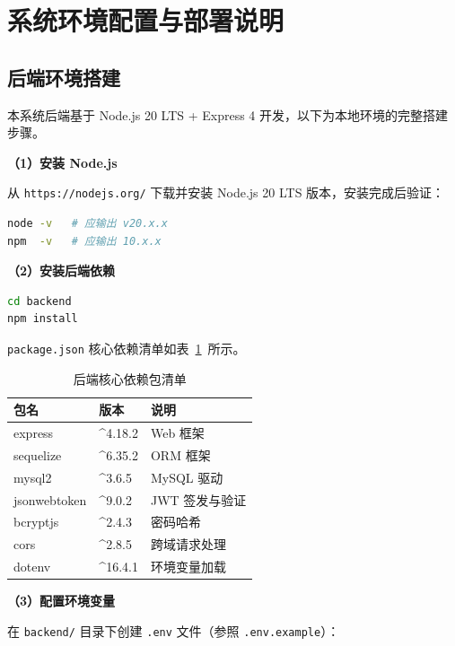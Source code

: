 \appendices
\section{系统环境配置与部署说明}

\subsection{后端环境搭建}

本系统后端基于 Node.js 20 LTS + Express 4 开发，以下为本地环境的完整搭建步骤。

\textbf{（1）安装 Node.js}

从 \texttt{https://nodejs.org/} 下载并安装 Node.js 20 LTS 版本，安装完成后验证：

\begin{lstlisting}[language=bash, caption={验证 Node.js 安装}]
node -v   # 应输出 v20.x.x
npm  -v   # 应输出 10.x.x
\end{lstlisting}

\textbf{（2）安装后端依赖}

\begin{lstlisting}[language=bash, caption={安装后端依赖包}]
cd backend
npm install
\end{lstlisting}

\texttt{package.json} 核心依赖清单如表~\ref{tab:A-1}~所示。

\begin{table}[H]
    \centering
    \caption{后端核心依赖包清单}
    \label{tab:A-1}
    \begin{tabular}{lll}
        \hline
        包名 & 版本 & 说明 \\
        \hline
        express & \^{}4.18.2 & Web 框架 \\
        sequelize & \^{}6.35.2 & ORM 框架 \\
        mysql2 & \^{}3.6.5 & MySQL 驱动 \\
        jsonwebtoken & \^{}9.0.2 & JWT 签发与验证 \\
        bcryptjs & \^{}2.4.3 & 密码哈希 \\
        cors & \^{}2.8.5 & 跨域请求处理 \\
        dotenv & \^{}16.4.1 & 环境变量加载 \\
        \hline
    \end{tabular}
\end{table}

\textbf{（3）配置环境变量}

在 \texttt{backend/} 目录下创建 \texttt{.env} 文件（参照 \texttt{.env.example}）：

